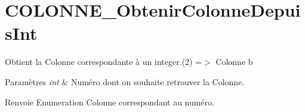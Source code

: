 \hypertarget{COLONNE_ObtenirColonneDepuisInt-example}{}\section{C\+O\+L\+O\+N\+N\+E\+\_\+\+Obtenir\+Colonne\+Depuis\+Int}
Obtient la Colonne correspondante à un integer.(2) =$>$ Colonne b


\begin{DoxyParams}{Paramètres}
{\em int} & Numéro dont on souhaite retrouver la Colonne.\\
\hline
\end{DoxyParams}
\begin{DoxyReturn}{Renvoie}
Enumeration Colonne correspondant au numéro.
\end{DoxyReturn}

\begin{DoxyCodeInclude}
\end{DoxyCodeInclude}
 